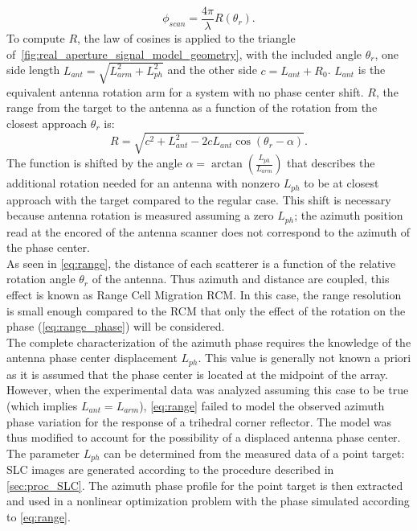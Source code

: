\begin{equation}\label{eq:range_phase}
	\phi_{scan} = \frac{4 \pi}{\lambda}R\left(\theta_r\right).
\end{equation}
To compute $R$, the law of cosines is applied to the triangle of~\autoref{fig:real_aperture_signal_model_geometry}, with the included angle $\theta_r$, one side length $L_{ant} = \sqrt{L_{arm}^2 + L_{ph}^2}$ and the other side $c = L_{ant} + R_0$.  $L_{ant}$ is the equivalent antenna rotation arm for a system with no phase center shift.
$R$, the range from the target to the antenna as a function of the rotation from the closest approach $\theta_r$ is:
\begin{equation}\label{eq:range}
	R = \sqrt{ c^2 +  L_{ant}^2 - 2 c L_{ant} \cos{\left(\theta_r - \alpha\right)}}.
\end{equation}
The function is shifted by the angle  $\alpha = \operatorname{\arctan}\left({\frac{L_{ph}}{L_{arm}}}\right)$ that describes the additional rotation needed for an antenna with nonzero $L_{ph}$ to be at closest approach with the target compared to the regular case. This shift is necessary because antenna rotation is measured assuming a zero $L_{ph}$; the azimuth position read at the encored of the antenna scanner does not correspond to the azimuth of the phase center.\\
As seen in \autoref{eq:range}, the distance of each scatterer is a function of the relative rotation angle $\theta_r$ of the antenna. Thus azimuth and distance are coupled, this effect is known as Range Cell Migration RCM. In this case, the range resolution is small enough compared to the RCM that only the effect of the rotation on the phase (\autoref{eq:range_phase}) will be considered.\\
The complete characterization of the azimuth phase requires the knowledge of the antenna phase center displacement $L_{ph}$. This value is generally not known a priori as it is assumed that the phase center is located at the midpoint of the array. However, when the experimental data was analyzed assuming this case to be true (which implies $L_{ant} = L_{arm}$),  \autoref{eq:range} failed to model the observed azimuth phase variation for the response of a trihedral corner reflector. The model was thus modified to account for the possibility of a displaced antenna phase center. The parameter $L_{ph}$ can be determined from the measured data of a point target: SLC images are generated according to the procedure described in \autoref{sec:proc_SLC}. The azimuth phase profile for the point target is then extracted and used in a nonlinear optimization problem with the phase simulated according to \autoref{eq:range}.
